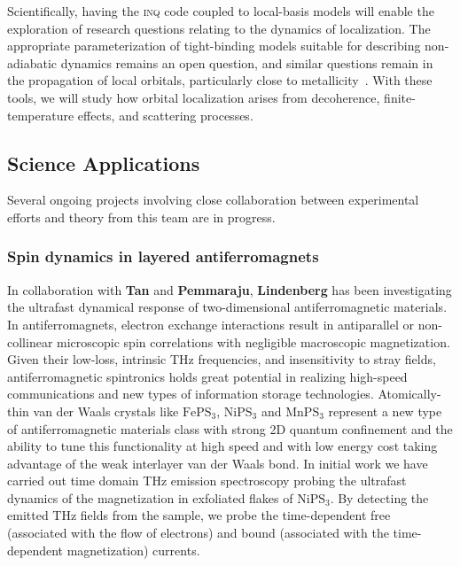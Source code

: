 Scientifically, having the \textsc{inq} code coupled to local-basis models will enable the exploration of research questions relating to the dynamics of localization. 
The appropriate parameterization of tight-binding models suitable for describing non-adiabatic dynamics remains an open question, and similar questions remain in the propagation of local orbitals, particularly close to metallicity~\cite{Yost2019}. 
With these tools, we will study how orbital localization arises from decoherence, finite-temperature effects, and scattering processes.  

\subsection{Science Applications}

Several ongoing projects involving close collaboration between experimental efforts and theory from this team are in progress.

\subsubsection{Spin dynamics in layered antiferromagnets}\label{sec:2dafm}

In collaboration with {\bf Tan} and {\bf Pemmaraju}, {\bf Lindenberg} has been investigating the ultrafast dynamical response of two-dimensional antiferromagnetic materials.
In antiferromagnets, electron exchange interactions result in antiparallel or non-collinear microscopic spin correlations with negligible macroscopic magnetization.
Given their low-loss, intrinsic THz frequencies, and insensitivity to stray fields, antiferromagnetic spintronics holds great potential in realizing high-speed communications and new types of information storage technologies. 
Atomically-thin van der Waals crystals like \(\mathrm{FePS_3}\), \(\mathrm{NiPS_3}\) and \(\mathrm{MnPS_3}\) represent a new type of antiferromagnetic materials class with strong 2D quantum confinement and the ability to tune this functionality at high speed and with low energy cost taking advantage of the weak interlayer van der Waals bond.
In initial work we have carried out time domain THz emission spectroscopy probing the ultrafast dynamics of the magnetization in exfoliated flakes of \(\mathrm{NiPS_3}\).
By detecting the emitted THz fields from the sample, we probe the time-dependent free (associated with the flow of electrons) and bound (associated with the time-dependent magnetization) currents.

